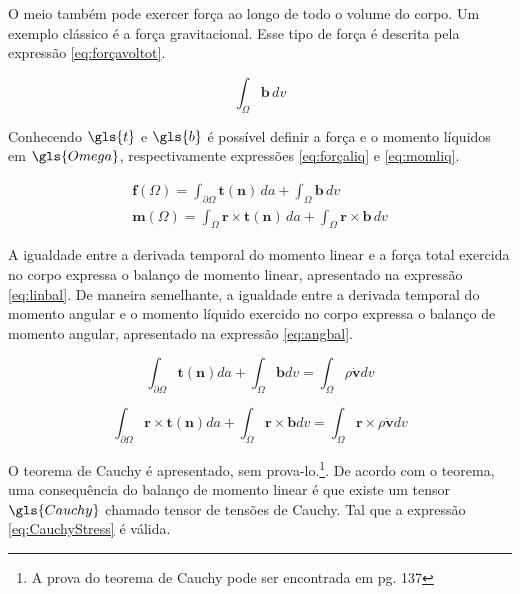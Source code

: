 O meio também pode exercer força ao longo de todo o volume do corpo. Um exemplo clássico é a força gravitacional. Esse tipo de força é descrita pela expressão \ref{eq:forçavoltot}.

\begin{equation}
    \int_{\Omega} \boldsymbol{b} \, dv
    \label{eq:forçavoltot}
\end{equation}

Conhecendo  $\gls{t}$ e $\gls{b}$ é possível definir a força e o momento líquidos em $ \gls{Omega}$, respectivamente expressões \ref{eq:forçaliq} e \ref{eq:momliq}.

\begin{align}
    \boldsymbol{f}(\Omega) = \int_{\partial \Omega} \boldsymbol{t(n)} \, da + \int_{\Omega} \boldsymbol{b} \, dv \label{eq:forçaliq} \\
    \boldsymbol{m}(\Omega) = \int_{\Omega} \boldsymbol{r} \times \boldsymbol{t(n)} \, da + \int_{\Omega} \boldsymbol{r} \times \boldsymbol{b} \, dv \label{eq:momliq}
\end{align}

A igualdade entre a derivada temporal do momento linear e a força total exercida no corpo expressa o balanço de momento linear, apresentado na expressão \ref{eq:linbal}. De maneira semelhante, a igualdade entre a derivada temporal do momento angular e o momento líquido exercido no corpo expressa o balanço de momento angular, apresentado na expressão \ref{eq:angbal}.

\begin{equation}
    \int_{\partial \Omega} \boldsymbol{t(n)} da + \int_{\Omega} \boldsymbol{b} dv = \int_{\Omega} \rho \dot{\boldsymbol{v}} dv \label{eq:linbal} 
\end{equation}

\begin{equation}
    \int_{\partial \Omega} \boldsymbol{r} \times \boldsymbol{t(n)} da + \int_{\Omega}    \boldsymbol{r} \times \boldsymbol{b} dv = \int_{\Omega} \boldsymbol{r} \times \rho \dot{\boldsymbol{v}} dv \label{eq:angbal} 
\end{equation}

O teorema de Cauchy é apresentado, sem prova-lo.\footnote{A prova do teorema de Cauchy pode ser encontrada em \cite{gurtin_fried_anand_2013} pg. 137}. De acordo com o teorema, uma consequência do balanço de momento linear é que existe um tensor $\gls{Cauchy}$ chamado tensor de tensões de Cauchy. Tal que a expressão \ref{eq:CauchyStress} é válida.

